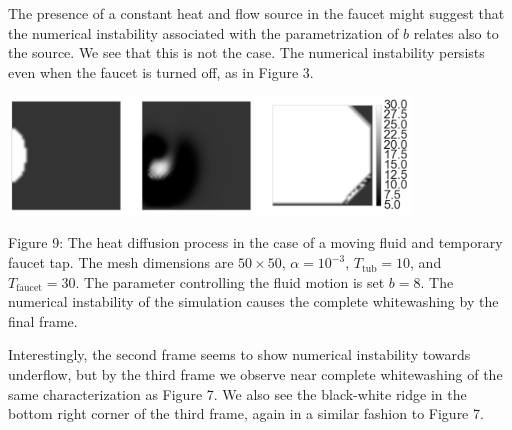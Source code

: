\documentclass[12pt]{amsart}
\begin{document}
The presence of a constant heat and flow source in the faucet might suggest that
the numerical instability associated with the parametrization of $b$ relates
also to the source. We see that this is not the case. The numerical instability
persists even when the faucet is turned off, as in Figure 3.

\begin{center}
    \includegraphics[width=0.8\textwidth]{../plots/diffusion-05.png}

    \justify
    \footnotesize{Figure 9: The heat diffusion process in the case of a moving fluid and
    temporary faucet tap. The mesh dimensions are $50 \times 50$, $\alpha =
    10^{-3}$, $T_{\mathrm{tub}} = 10$, and $T_{\mathrm{faucet}} = 30$. The
    parameter controlling the fluid motion is set $b = 8$. The numerical
    instability of the simulation causes the complete whitewashing by the final
frame.}
\end{center}

Interestingly, the second frame seems to show numerical instability towards
underflow, but by the third frame we observe near complete whitewashing of the
same characterization as Figure 7. We also see the black-white ridge in the
bottom right corner of the third frame, again in a similar fashion to Figure 7.
\end{document}

